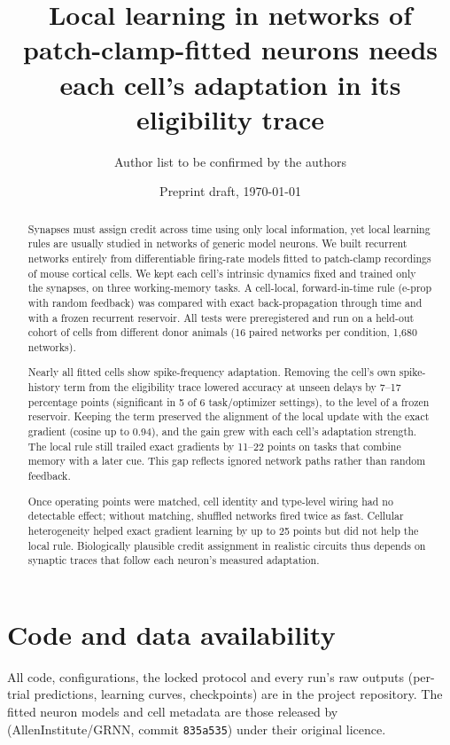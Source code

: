 \documentclass[11pt]{article}
\title{Local learning in networks of patch-clamp-fitted neurons needs each cell's adaptation
in its eligibility trace}
\author{Author list to be confirmed by the authors}
\date{Preprint draft, \today}
\begin{document}
\maketitle

\begin{abstract}
Synapses must assign credit across time using only local information, yet local learning rules
are usually studied in networks of generic model neurons. We built recurrent networks entirely
from differentiable firing-rate models fitted to patch-clamp recordings of mouse cortical cells.
We kept each cell's intrinsic dynamics fixed and trained only the synapses, on three working-memory
tasks. A cell-local, forward-in-time rule (e-prop with random feedback) was compared with exact
back-propagation through time and with a frozen recurrent reservoir. All tests were preregistered
and run on a held-out cohort of cells from different donor animals (16 paired networks per
condition, 1,680 networks).

Nearly all fitted cells show spike-frequency adaptation. Removing the cell's own spike-history term
from the eligibility trace lowered accuracy at unseen delays by 7--17 percentage points
(significant in 5 of 6 task/optimizer settings), to the level of a frozen reservoir. Keeping the
term preserved the alignment of the local update with the exact gradient (cosine up to 0.94),
and the gain grew with each cell's adaptation strength. The local rule still trailed exact
gradients by 11--22 points on tasks that combine memory with a later cue. This gap reflects ignored
network paths rather than random feedback.

Once operating points were matched, cell identity and type-level wiring had no detectable effect;
without matching, shuffled networks fired twice as fast. Cellular heterogeneity helped exact
gradient learning by up to 25 points but did not help the local rule. Biologically plausible
credit assignment in realistic circuits thus depends on synaptic traces that follow each
neuron's measured adaptation.
\end{abstract}






\section*{Code and data availability}
All code, configurations, the locked protocol and every run's raw outputs (per-trial
predictions, learning curves, checkpoints) are in the project repository. The fitted
neuron models and cell metadata are those released by \citet{yeung2025gfr}
(AllenInstitute/GRNN, commit \texttt{835a535}) under their original licence.




\clearpage
\appendix

\end{document}
